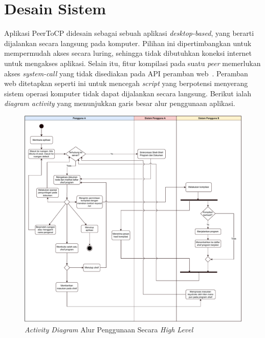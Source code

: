\section{Desain Sistem}

Aplikasi PeerToCP didesain sebagai sebuah aplikasi \textit{desktop-based}, yang berarti dijalankan secara langsung pada komputer. Pilihan ini dipertimbangkan untuk mempermudah akses secara luring, sehingga tidak dibutuhkan koneksi internet untuk mengakses aplikasi. Selain itu, fitur kompilasi pada suatu \textit{peer} memerlukan akses \textit{system-call} yang tidak disediakan pada API peramban web~\citep{v8, spidermonkey}. Peramban web ditetapkan seperti ini untuk mencegah \textit{script} yang berpotensi menyerang sistem operasi komputer tidak dapat dijalankan secara langsung. Berikut ialah \textit{diagram activity} yang menunjukkan garis besar alur penggunaan aplikasi.

\begin{figure}
    \centering
    \includegraphics[scale=0.5]{assets/skripsi/Activity_Diagram}
    \caption{\textit{Activity Diagram} Alur Penggunaan Secara \textit{High Level}}
    \label{fig:activity}
\end{figure}

